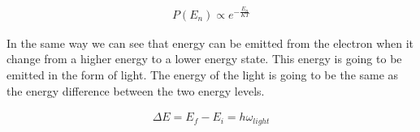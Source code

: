 \begin{equation}
  \begin{array}{c}
    P(E_n) \propto e^{-\frac{E_n}{KT}}
  \end{array}
\end{equation}

In the same way we can see that energy can be emitted from the electron when it change from a higher energy to a lower energy state. This energy is going to be emitted in the form of light. The energy of the light is going to be the same as the energy difference between the two energy levels.

\begin{equation}
  \begin{array}{c}
    \Delta E = E_f - E_i = h\omega_{light}
  \end{array}
\end{equation}
